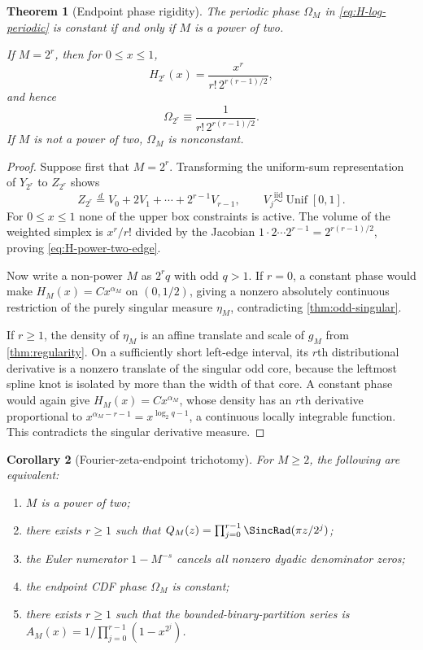 \documentclass[11pt,oneside]{article}
\newtheorem{theorem}{Theorem}[section]
\newtheorem{corollary}[theorem]{Corollary}
\theoremstyle{definition}
\theoremstyle{remark}
\begin{document}
\begin{theorem}[Endpoint phase rigidity]
\label{thm:endpoint-rigidity}
The periodic phase $\Omega_M$ in \eqref{eq:H-log-periodic} is constant if and only if
$M$ is a power of two.

If $M=2^r$, then for $0\le x\le1$,
\begin{equation}
 H_{2^r}(x)=\frac{x^r}{r!\,2^{r(r-1)/2}},
 \label{eq:H-power-two-edge}
\end{equation}
and hence
\begin{equation}
 \Omega_{2^r}\equiv\frac1{r!\,2^{r(r-1)/2}}.
 \label{eq:Omega-power-two}
\end{equation}
If $M$ is not a power of two, $\Omega_M$ is nonconstant.
\end{theorem}

\begin{proof}
Suppose first that $M=2^r$.  Transforming the uniform-sum representation of $Y_{2^r}$
to $Z_{2^r}$ shows
\begin{equation}
 Z_{2^r}\overset d=V_0+2V_1+\cdots+2^{r-1}V_{r-1},
 \qquad V_j\overset{\mathrm{iid}}\sim\operatorname{Unif}[0,1].
 \label{eq:Z-power-two-uniforms}
\end{equation}
For $0\le x\le1$ none of the upper box constraints is active.  The volume of the weighted
simplex is $x^r/r!$ divided by the Jacobian
$1\cdot2\cdots2^{r-1}=2^{r(r-1)/2}$, proving \eqref{eq:H-power-two-edge}.

Now write a non-power $M$ as $2^rq$ with odd $q>1$.  If $r=0$, a constant phase would
make $H_M(x)=Cx^{\alpha_M}$ on $(0,1/2)$, giving a nonzero absolutely continuous
restriction of the purely singular measure $\eta_M$, contradicting
\cref{thm:odd-singular}.

If $r\ge1$, the density of $\eta_M$ is an affine translate and scale of $g_M$ from
\cref{thm:regularity}.  On a sufficiently short left-edge interval, its $r$th
distributional derivative is a nonzero translate of the singular odd core, because the
leftmost spline knot is isolated by more than the width of that core.  A constant phase
would again give $H_M(x)=Cx^{\alpha_M}$, whose density has an $r$th derivative
proportional to
$x^{\alpha_M-r-1}=x^{\log_2q-1}$, a continuous locally integrable function.  This
contradicts the singular derivative measure.
\end{proof}

\begin{corollary}[Fourier-zeta-endpoint trichotomy]
\label{cor:rigidity-equivalences}
For $M\ge2$, the following are equivalent:
\begin{enumerate}
\item $M$ is a power of two;
\item there exists $r\ge1$ such that
$Q_M(z)=\prod_{j=0}^{r-1}\SincRad(\pi z/2^j)$;
\item the Euler numerator $1-M^{-s}$ cancels all nonzero dyadic denominator zeros;
\item the endpoint CDF phase $\Omega_M$ is constant;
\item there exists $r\ge1$ such that the bounded-binary-partition series is
$A_M(x)=1/\prod_{j=0}^{r-1}(1-x^{2^j})$.
\end{enumerate}
\end{corollary}
\end{document}
